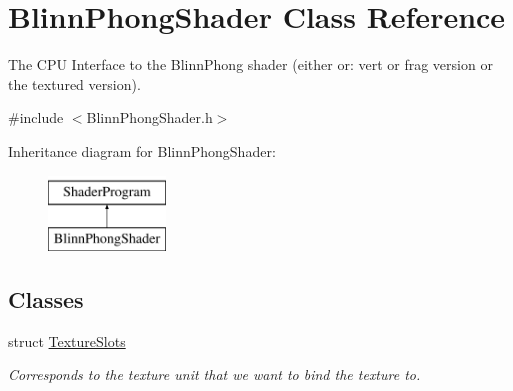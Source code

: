 \hypertarget{class_blinn_phong_shader}{}\section{Blinn\+Phong\+Shader Class Reference}
\label{class_blinn_phong_shader}


The C\+PU Interface to the Blinn\+Phong shader (either or\+: vert or frag version or the textured version).  




{\ttfamily \#include $<$Blinn\+Phong\+Shader.\+h$>$}

Inheritance diagram for Blinn\+Phong\+Shader\+:\begin{figure}[H]
\begin{center}
\leavevmode
\includegraphics[height=2.000000cm]{class_blinn_phong_shader}
\end{center}
\end{figure}
\subsection*{Classes}
\begin{DoxyCompactItemize}
\item 
struct \hyperlink{struct_blinn_phong_shader_1_1_texture_slots}{Texture\+Slots}
\begin{DoxyCompactList}\small\item\em Corresponds to the texture unit that we want to bind the texture to. \end{DoxyCompactList}\end{DoxyCompactItemize}
